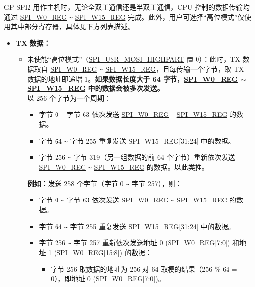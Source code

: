 \documentclass[main\_\_CN.tex]{subfiles}
\begin{document}
GP-SPI2 用作主机时，无论全双工通信还是半双工通信，CPU 控制的数据传输均通过 \hyperref[regdesc:SPIW0REG]{SPI\_W0\_REG} \verb+~+ \hyperref[regdesc:SPIW0REG]{SPI\_W15\_REG} 完成。此外，用户可选择“高位模式”仅使用其中部分寄存器，具体见下方列表描述。

\begin{itemize}
    \item \textbf{TX 数据：}
    \begin{itemize}
        \item 未使能“高位模式”（\hyperref[fielddesc:SPIUSRMOSIHIGHPART]{SPI\_USR\_MOSI\_HIGHPART} 置 0）：此时，TX 数据取自 \hyperref[regdesc:SPIW0REG]{SPI\_W0\_REG} \verb+~+ \hyperref[regdesc:SPIW0REG]{SPI\_W15\_REG}，且每传输一个字节，取 TX 数据的地址即递增 1。\textbf{如果数据长度大于 64 字节，\hyperref[regdesc:SPIW0REG]{SPI\_W0\_REG} $\sim$ \hyperref[regdesc:SPIW0REG]{SPI\_W15\_REG} 中的数据会被多次发送。}\\
        以 256 个字节为一个周期：
        \begin{itemize}
            \item 字节 0 \verb+~+ 字节 63 依次发送 \hyperref[regdesc:SPIW0REG]{SPI\_W0\_REG} \verb+~+ \hyperref[regdesc:SPIW0REG]{SPI\_W15\_REG} 的数据。
            \item 字节 64 \verb+~+ 字节 255 重复发送 \hyperref[regdesc:SPIW0REG]{SPI\_W15\_REG}[31:24] 中的数据。
            \item 字节 256 \verb+~+ 字节 319（另一组数据的前 64 个字节）重新依次发送 \hyperref[regdesc:SPIW0REG]{SPI\_W0\_REG} \verb+~+ \hyperref[regdesc:SPIW0REG]{SPI\_W15\_REG} 的数据。以此类推。
        \end{itemize}
        \textbf{例如：}发送 258 个字节（字节 0 \verb+~+ 字节 257），则：
        \begin{itemize}
            \item 字节 0 \verb+~+ 字节 63 依次发送 \hyperref[regdesc:SPIW0REG]{SPI\_W0\_REG} \verb+~+ \hyperref[regdesc:SPIW0REG]{SPI\_W15\_REG} 的数据。
            \item 字节 64 \verb+~+ 字节 255 重复发送 \hyperref[regdesc:SPIW0REG]{SPI\_W15\_REG}[31:24] 中的数据。
            \item 字节 256 \verb+~+ 字节 257 重新依次发送地址 0 (\hyperref[regdesc:SPIW0REG]{SPI\_W0\_REG}[7:0]) 和地址 1 (\hyperref[regdesc:SPIW0REG]{SPI\_W0\_REG}[15:8]) 的数据：
                \begin{itemize}
                    \item 字节 256 取数据的地址为 256 对 64 取模的结果（256 \% 64 = 0），即地址 0 (\hyperref[regdesc:SPIW0REG]{SPI\_W0\_REG}[7:0])。

\end{itemize}
\end{itemize}
\end{itemize}
\end{itemize}
\end{document}
